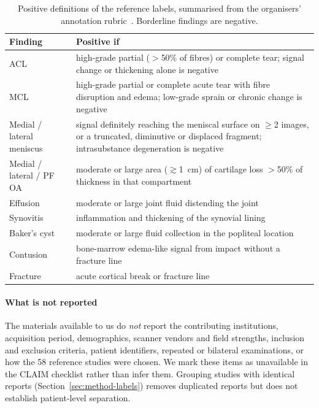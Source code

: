 \documentclass{ieeeaccess}
\begin{document}
\begin{table}[!t]
\centering
\caption{Positive definitions of the reference labels, summarised from the organisers' annotation rubric~\cite{chen2026overview}.
Borderline findings are negative.}
\label{tab:defs}
\footnotesize
\setlength{\tabcolsep}{3pt}
\begin{tabular}{p{1.9cm}p{6.0cm}}
\toprule
Finding & Positive if\\
\midrule
ACL & high-grade partial ($>$50\% of fibres) or complete tear; signal change or thickening alone is negative\\
MCL & high-grade partial or complete acute tear with fibre disruption and edema; low-grade sprain or chronic change is negative\\
Medial / lateral meniscus & signal definitely reaching the meniscal surface on $\geq$2 images, or a truncated, diminutive or displaced fragment; intrasubstance degeneration is negative\\
Medial / lateral / PF OA & moderate or large area ($\gtrsim$1~cm) of cartilage loss $>$50\% of thickness in that compartment\\
Effusion & moderate or large joint fluid distending the joint\\
Synovitis & inflammation and thickening of the synovial lining\\
Baker's cyst & moderate or large fluid collection in the popliteal location\\
Contusion & bone-marrow edema-like signal from impact without a fracture line\\
Fracture & acute cortical break or fracture line\\
\bottomrule
\end{tabular}
\end{table}

\paragraph*{What is not reported} The materials available to us do \emph{not} report the contributing institutions,
acquisition period, demographics, scanner vendors and field strengths, inclusion and exclusion criteria, patient
identifiers, repeated or bilateral examinations, or how the 58 reference studies were chosen. We mark these items as
unavailable in the CLAIM checklist rather than infer them. Grouping studies with identical reports
(Section~\ref{sec:method-labels}) removes duplicated reports but does not establish patient-level separation.
\end{document}
